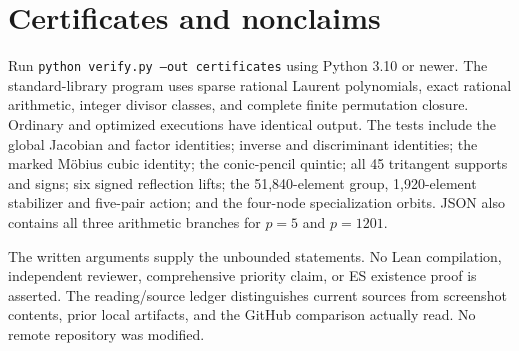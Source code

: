 \documentclass[11pt]{article}
\theoremstyle{remark}\newtheorem{remark}[theorem]{Remark}
\begin{document}
\section{Certificates and nonclaims}
Run \texttt{python verify.py --out certificates} using Python 3.10 or newer. The standard-library program uses sparse rational Laurent polynomials, exact rational arithmetic, integer divisor classes, and complete finite permutation closure. Ordinary and optimized executions have identical output. The tests include the global Jacobian and factor identities; inverse and discriminant identities; the marked M\"obius cubic identity; the conic-pencil quintic; all 45 tritangent supports and signs; six signed reflection lifts; the 51,840-element group, 1,920-element stabilizer and five-pair action; and the four-node specialization orbits. JSON also contains all three arithmetic branches for $p=5$ and $p=1201$.

The written arguments supply the unbounded statements. No Lean compilation, independent reviewer, comprehensive priority claim, or ES existence proof is asserted. The reading/source ledger distinguishes current sources from screenshot contents, prior local artifacts, and the GitHub comparison actually read. No remote repository was modified.
\end{document}
